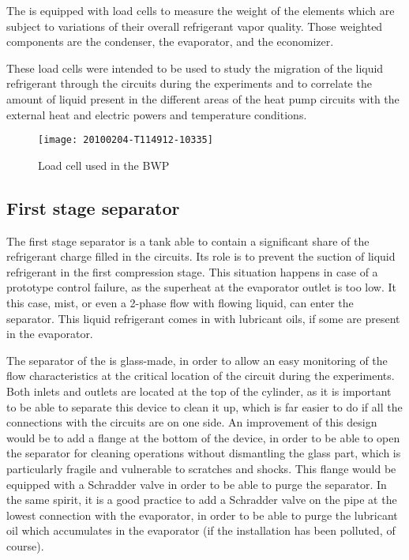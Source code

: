 The \BWP{} is equipped with load cells to measure the weight of the
elements which are subject to variations of their overall refrigerant
vapor quality. Those weighted components are the condenser, the
evaporator, and the economizer.

These load cells were intended to be used to study the migration of
the liquid refrigerant through the circuits during the experiments and
to correlate the amount of liquid present in the different areas of
the heat pump circuits with the external heat and electric powers and
temperature conditions.

\begin{figure}[htbp]
  \centering
  \texttt{[image: 20100204-T114912-10335]}
  \caption{Load cell used in the BWP}
  \label{fig:bwp-load-cell}
\end{figure}

\subsection{First stage separator}
\label{sec:bwp-separator}

The first stage separator is a tank able to contain a significant share
of the refrigerant charge filled in the circuits. Its role is to prevent
the suction of liquid refrigerant in the first compression stage. This
situation happens in case of a prototype control failure, as the
superheat at the evaporator outlet is too low. It this case, mist, or
even a 2-phase flow with flowing liquid, can enter the separator. This
liquid refrigerant comes in with lubricant oils, if
some are present in the evaporator.

The separator of the \BWP{} is glass-made, in order to allow an easy
monitoring of the flow characteristics at the critical location of the
circuit during the experiments. Both inlets and outlets are located at
the top of the cylinder, as it is important to be able to separate
this device to clean it up, which is far easier to do if all the
connections with the circuits are on one side. An improvement of this
design would be to add a flange at the bottom of the device, in order
to be able to open the separator for cleaning operations without
dismantling the glass part, which is particularly fragile and
vulnerable to scratches and shocks. This flange would be equipped with
a Schradder valve in order to be able to purge the separator. In the
same spirit, it is a good practice to add a Schradder valve on the
pipe at the lowest connection with the evaporator, in order to be able
to purge the lubricant oil which accumulates in the evaporator (if the
installation has been polluted, of course).

